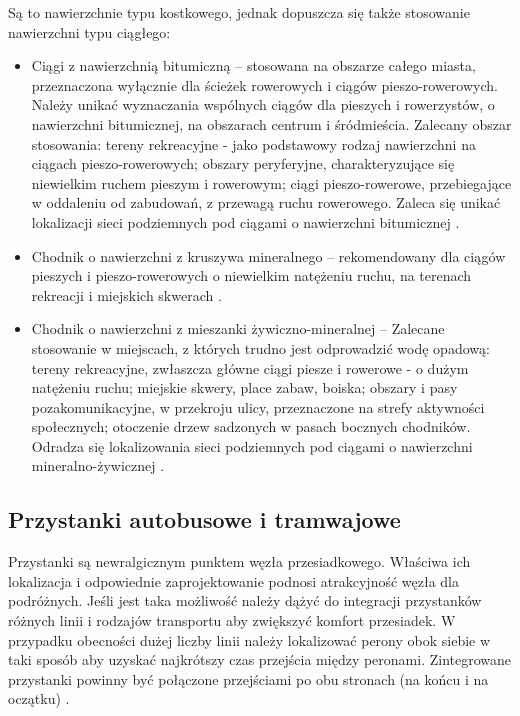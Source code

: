 \documentclass[twoside,12pt]{article}
\begin{document}
	 \begin{samepage}Są to nawierzchnie typu kostkowego, jednak dopuszcza się także stosowanie nawierzchni typu ciągłego:
	 
	 \begin{itemize}\setlength{\itemsep}{0em}
	 \item Ciągi z nawierzchnią bitumiczną --  stosowana na obszarze całego miasta, przeznaczona wyłącznie dla ścieżek rowerowych i ciągów pieszo-rowerowych. Należy unikać wyznaczania wspólnych ciągów dla pieszych i rowerzystów, o nawierzchni bitumicznej, na obszarach centrum i śródmieścia. Zalecany obszar stosowania: tereny rekreacyjne - jako podstawowy rodzaj nawierzchni na ciągach pieszo-rowerowych;  obszary peryferyjne, charakteryzujące się niewielkim ruchem pieszym i rowerowym; ciągi pieszo-rowerowe, przebiegające w oddaleniu od zabudowań, z przewagą ruchu rowerowego.  Zaleca się unikać lokalizacji sieci podziemnych pod ciągami o nawierzchni bitumicznej \cite{standardy_wroclaw}. 
	\item Chodnik o nawierzchni z kruszywa mineralnego -- rekomendowany dla ciągów pieszych i pieszo-rowerowych o niewielkim natężeniu ruchu, na terenach rekreacji i miejskich skwerach \cite{standardy_wroclaw}.
	\item Chodnik o nawierzchni z mieszanki żywiczno-mineralnej -- Zalecane stosowanie w miejscach, z których trudno jest odprowadzić wodę opadową: tereny rekreacyjne, zwłaszcza główne ciągi piesze i rowerowe - o dużym natężeniu ruchu;  miejskie skwery, place zabaw, boiska; obszary i pasy pozakomunikacyjne, w przekroju ulicy, przeznaczone na strefy aktywności społecznych; otoczenie drzew sadzonych w pasach bocznych chodników. Odradza się lokalizowania sieci podziemnych pod ciągami o nawierzchni mineralno-żywicznej \cite{standardy_wroclaw}. 
	 \end{itemize}\end{samepage}
	 
\subsection{Przystanki autobusowe i tramwajowe}

	Przystanki są newralgicznym punktem węzła przesiadkowego. Właściwa ich lokalizacja i odpowiednie zaprojektowanie podnosi atrakcyjność węzła dla podróżnych. Jeśli jest taka możliwość należy dążyć do integracji przystanków różnych linii i rodzajów transportu aby zwiększyć komfort przesiadek. W przypadku obecności dużej liczby linii należy lokalizować perony obok siebie w taki sposób aby uzyskać najkrótszy czas przejścia między peronami. Zintegrowane przystanki powinny być połączone przejściami po obu stronach (na końcu i na oczątku) \cite{standardy_wroclaw}. 
	
\end{document}
